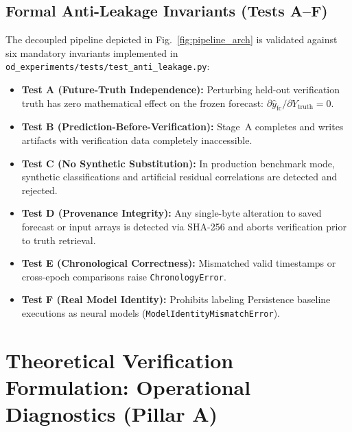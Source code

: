 \documentclass[10pt,twocolumn,letterpaper]{article}
\begin{document}
\subsection{Formal Anti-Leakage Invariants (Tests A--F)}
The decoupled pipeline depicted in Fig.~\ref{fig:pipeline_arch} is validated against six mandatory invariants implemented in \texttt{od\_experiments/tests/test\_anti\_leakage.py}:
\begin{itemize}
    \item \textbf{Test A (Future-Truth Independence):} Perturbing held-out verification truth has zero mathematical effect on the frozen forecast: $\partial \hat{y}_\mathrm{fc} / \partial Y_\mathrm{truth} = 0$.
    \item \textbf{Test B (Prediction-Before-Verification):} Stage~A completes and writes artifacts with verification data completely inaccessible.
    \item \textbf{Test C (No Synthetic Substitution):} In production benchmark mode, synthetic classifications and artificial residual correlations are detected and rejected.
    \item \textbf{Test D (Provenance Integrity):} Any single-byte alteration to saved forecast or input arrays is detected via SHA-256 and aborts verification prior to truth retrieval.
    \item \textbf{Test E (Chronological Correctness):} Mismatched valid timestamps or cross-epoch comparisons raise \texttt{ChronologyError}.
    \item \textbf{Test F (Real Model Identity):} Prohibits labeling Persistence baseline executions as neural models (\texttt{ModelIdentityMismatchError}).
\end{itemize}

\section{Theoretical Verification Formulation: Operational Diagnostics (Pillar A)}
\end{document}
